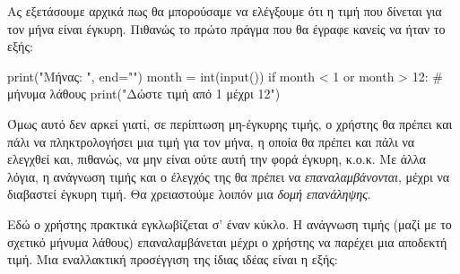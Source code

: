 \documentclass[a4paper,11pt,oneside]{book}
\begin{document}
Ας εξετάσουμε αρχικά πως θα μπορούσαμε να ελέγξουμε ότι η τιμή που δίνεται για τον μήνα είναι έγκυρη. Πιθανώς το πρώτο πράγμα που θα έγραφε κανείς να ήταν το εξής:

\begin{pycode}
print("Mήνας: ", end="")
month = int(input())
if month < 1 or month > 12:
    # μήνυμα λάθους
    print("Δώστε τιμή από 1 μέχρι 12")
\end{pycode}

Όμως αυτό δεν αρκεί γιατί, σε περίπτωση μη-έγκυρης τιμής, ο χρήστης θα πρέπει και πάλι να πληκτρολογήσει μια τιμή για τον μήνα, η οποία θα πρέπει και πάλι να ελεγχθεί και, πιθανώς, να μην είναι ούτε αυτή την φορά έγκυρη, κ.ο.κ. Με άλλα λόγια, η ανάγνωση τιμής και ο έλεγχός της θα πρέπει να \emph{επαναλαμβάνονται}, μέχρι να διαβαστεί έγκυρη τιμή. Θα χρειαστούμε λοιπόν μια \emph{δομή επανάληψης}.%
        

Εδώ ο χρήστης πρακτικά εγκλωβίζεται σ' έναν κύκλο. Η ανάγνωση τιμής (μαζί με το σχετικό μήνυμα λάθους) επαναλαμβάνεται μέχρι ο χρήστης να παρέχει μια αποδεκτή τιμή. %
Μια εναλλακτική προσέγγιση της ίδιας ιδέας είναι η εξής:
\end{document}
